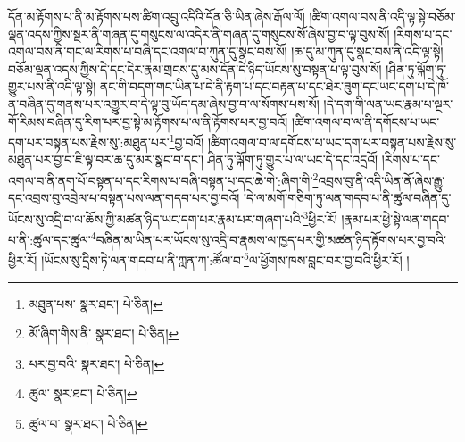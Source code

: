 དོན་མ་རྟོགས་པ་ནི་མ་རྟོགས་པས་ཚིག་འབྲུ་འདིའི་དོན་ཅི་ཡིན་ཞེས་རྒོལ་ལོ། །ཚིག་འགལ་བས་ནི་འདི་ལྟ་སྟེ་བཅོམ་ལྡན་འདས་ཀྱིས་སྔར་ནི་གཞན་དུ་གསུངས་ལ་འདིར་ནི་གཞན་དུ་གསུངས་སོ་ཞེས་བྱ་བ་ལྟ་བུས་སོ། །རིགས་པ་དང་འགལ་བས་ནི་གང་ལ་རིགས་པ་བཞི་དང་འགལ་བ་ཀུན་དུ་སྣང་བས་སོ། །ཆ་དུ་མ་ཀུན་དུ་སྣང་བས་ནི་འདི་ལྟ་སྟེ། བཅོམ་ལྡན་འདས་ཀྱིས་དེ་དང་དེར་རྣམ་གྲངས་དུ་མས་དོན་དེ་ཉིད་ཡོངས་སུ་བསྟན་པ་ལྟ་བུས་སོ། །ཤིན་ཏུ་ལྐོག་ཏུ་གྱུར་པས་ནི་འདི་ལྟ་སྟེ། ནང་གི་བདག་གང་ཡིན་པ་དེ་ནི་རྟག་པ་དང་བརྟན་པ་དང་ཐེར་ཟུག་དང་ཡང་དག་པ་དེ་ཁོ་ན་བཞིན་དུ་གནས་པར་འགྱུར་བ་དེ་ལྟ་བུ་ཡོད་དམ་ཞེས་བྱ་བ་ལ་སོགས་པས་སོ། །དེ་དག་གི་ལན་ཡང་རྣམ་པ་ལྔར་གོ་རིམས་བཞིན་དུ་རིག་པར་བྱ་སྟེ་མ་རྟོགས་པ་ལ་ནི་རྟོགས་པར་བྱ་བའོ། །ཚིག་འགལ་བ་ལ་ནི་དགོངས་པ་ཡང་དག་པར་བསྟན་པས་རྗེས་སུ་:མཐུན་པར་\footnote{མཐུན་པས་  སྣར་ཐང་།  པེ་ཅིན། }བྱ་བའོ། །ཚིག་འགལ་བ་ལ་དགོངས་པ་ཡང་དག་པར་བསྟན་པས་རྗེས་སུ་མཐུན་པར་བྱ་བ་ཇི་ལྟ་བར་ཆ་དུ་མར་སྣང་བ་དང་། ཤིན་ཏུ་ལྐོག་ཏུ་གྱུར་པ་ལ་ཡང་དེ་དང་འདྲའོ། །རིགས་པ་དང་འགལ་བ་ནི་ནག་པོ་བསྟན་པ་དང་རིགས་པ་བཞི་བསྟན་པ་དང་ཆེ་གེ་:ཞིག་གི་\footnote{མོ་ཞིག་གིས་ནི་  སྣར་ཐང་།  པེ་ཅིན། }འབྲས་བུ་ནི་འདི་ཡིན་ནོ་ཞེས་རྒྱུ་དང་འབྲས་བུ་འབྲེལ་པ་བསྟན་པས་ལན་གདབ་པར་བྱ་བའོ། །དེ་ལ་མགོ་གཅིག་ཏུ་ལན་གདབ་པ་ནི་ཚུལ་བཞིན་དུ་ཡོངས་སུ་འདྲི་བ་ལ་ཆོས་ཀྱི་མཚན་ཉིད་ཡང་དག་པར་རྣམ་པར་གཞག་པའི་\footnote{པར་བྱ་བའི་  སྣར་ཐང་།  པེ་ཅིན། }ཕྱིར་རོ། །རྣམ་པར་ཕྱེ་སྟེ་ལན་གདབ་པ་ནི་:ཚུལ་དང་ཚུལ་\footnote{ཚུལ་  སྣར་ཐང་།  པེ་ཅིན། }བཞིན་མ་ཡིན་པར་ཡོངས་སུ་འདྲི་བ་རྣམས་ལ་ཁྱད་པར་གྱི་མཚན་ཉིད་རྟོགས་པར་བྱ་བའི་ཕྱིར་རོ། །ཡོངས་སུ་དྲིས་ཏེ་ལན་གདབ་པ་ནི་ཀླན་ཀ་:ཚོལ་བ་\footnote{ཚུལ་བ་  སྣར་ཐང་།  པེ་ཅིན། }ལ་ཕྱོགས་ཁས་བླང་བར་བྱ་བའི་ཕྱིར་རོ། །
